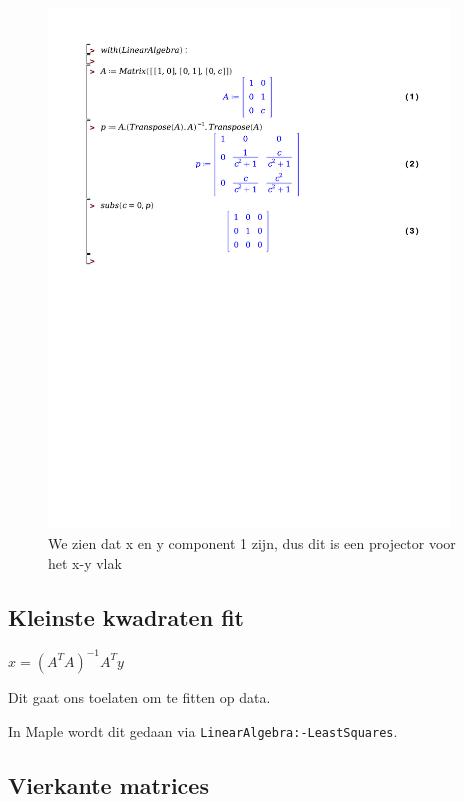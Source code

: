 \documentclass[a4paper]{report}
\begin{document}
\begin{figure}[H]
	\begin{center}
		\includegraphics[width=0.95\textwidth]{./projector.pdf}
	\end{center}
	\caption{We zien dat x en y component 1 zijn, dus dit is een projector voor het x-y vlak}
	\label{fig:projectie}
\end{figure}

\subsection{Kleinste kwadraten fit}

$x = (A^T A)^{-1} A^T y$

Dit gaat ons toelaten om te fitten op data.

In Maple wordt dit gedaan via \texttt{LinearAlgebra:-LeastSquares}.

\subsection{Vierkante matrices}
\end{document}
